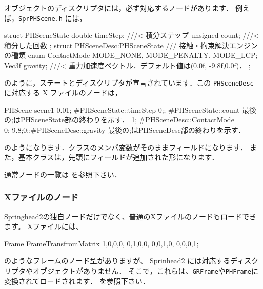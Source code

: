 \KLUDGE オブジェクトのディスクリプタには，必ず対応するノードがあります．
\KLUDGE 例えば，\texttt{SprPHScene.h} \KLUDGE には，

\begin{sourcecode}
struct PHSceneState{
    double timeStep;      ///< 積分ステップ
    unsigned count;       ///< 積分した回数
};
struct PHSceneDesc:PHSceneState{
    /// 接触・拘束解決エンジンの種類
    enum ContactMode{ MODE_NONE, MODE_PENALTY, MODE_LCP};
    Vec3f gravity;      ///< 重力加速度ベクトル．デフォルト値は(0.0f, -9.8f,0.0f)．
};
\end{sourcecode}

\KLUDGE のように，ステートとディスクリプタが宣言されています．この \texttt{PHSceneDesc} \KLUDGE に対応する X \KLUDGE ファイルのノードは，
\begin{sourcecode}
PHScene scene1{                                                                     0.01;     #PHSceneState::timeStep
    0;;       #PHSceneState::count     最後の;はPHSceneState部の終わりを示す．
    1;        #PHSceneDesc::ContactMode
    0;-9.8;0;;#PHSceneDesc::gravity    最後の;はPHSceneDesc部の終わりを示す．
}
\end{sourcecode}

\KLUDGE のようになります．クラスのメンバ変数がそのままフィールドになります．
\KLUDGE また，基本クラスは，先頭にフィールドが追加された形になります．

\KLUDGE 通常ノードの一覧は  \KLUDGE を参照下さい．

\subsubsection{X\KLUDGE ファイルのノード}
Springhead2\KLUDGE の独自ノードだけでなく、普通のX\KLUDGE ファイルのノードもロードできます。
X\KLUDGE ファイルには、
\begin{sourcecode}
Frame{
    FrameTransfromMatrix{ 1,0,0,0, 0,1,0,0, 0,0,1,0, 0,0,0,1; }
}
\end{sourcecode}
\KLUDGE のようなフレームのノード型がありますが、
Sprinhead2 \KLUDGE には対応するディスクリプタやオブジェクトがありません．
\KLUDGE そこで，これらは、\texttt{GRFrame}\KLUDGE や\texttt{PHFrame}\KLUDGE に
\KLUDGE 変換されてロードされます．
 \KLUDGE を参照下さい．


